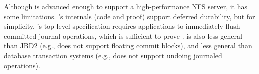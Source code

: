 
Although \txn is advanced enough to support a high-performance NFS
server, it has some limitations.  \txn's internals (code and proof)
support deferred durability, but for simplicity, \txn's top-level
specification requires applications to immediately flush committed
journal operations, which is sufficient to prove \simplenfs.  \txn is also
less general than JBD2 (e.g., \txn does not support floating commit
blocks), and less general than database transaction systems (e.g.,
\txn does not support undoing journaled operations).

